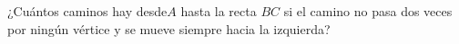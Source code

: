 ¿Cuántos caminos hay desde$ A$ hasta la recta $BC$ si el camino no pasa dos veces por ningún vértice y se mueve siempre hacia la izquierda? 
